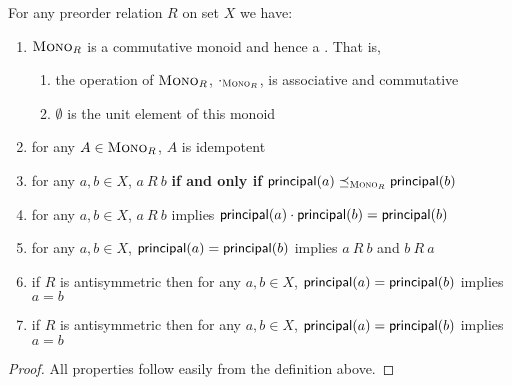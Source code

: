 \documentclass{scrartcl}
\begin{document}
\begin{lemma}
  For any preorder relation $R$ on set $X$ we have:
  \begin{enumerate}
    \item $\textsc{Mono}_{R}$ is a commutative monoid and hence a \PCM{}. That is,
      \begin{enumerate}
      \item the operation of $\textsc{Mono}_{R}$, $\cdot_{\textsc{Mono}_{R}}$, is
        associative and commutative
        \item $\emptyset$ is the unit element of this monoid
      \end{enumerate}
    \item for any $A \in \textsc{Mono}_{R}$, $A$ is idempotent
    \item for any $a, b \in X$, $a ~R~ b$ \textbf{if and only if} $\mathsf{principal}(a) \preceq_{\textsc{Mono}_{R}} \mathsf{principal}(b)$
    \item for any $a, b \in X$, $a ~R~ b$ implies $\mathsf{principal}(a) \cdot \mathsf{principal}(b) = \mathsf{principal}(b)$
    \item for any $a, b \in X$, $\mathsf{principal}(a) = \mathsf{principal}(b)$ implies $a ~R~ b$ and $b ~R~a$
    \item if $R$ is antisymmetric then for any $a, b \in X$,
      $\mathsf{principal}(a) = \mathsf{principal}(b)$ implies $a = b$
    \item if $R$ is antisymmetric then for any $a, b \in X$,
      $\mathsf{principal}(a) = \mathsf{principal}(b)$ implies $a = b$
    \end{enumerate}
\end{lemma}
\begin{proof}
  All properties follow easily from the definition above.
\end{proof}
\end{document}
